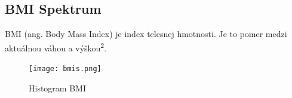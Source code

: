 \subsection{BMI Spektrum}

BMI (ang. Body Mass Index) je index telesnej hmotnosti. Je to pomer medzi aktuálnou váhou a výškou\textsuperscript 2.

\begin{figure}[h!]
	\centering
  		\texttt{[image: bmis.png]}
  	\caption{Histogram BMI}
  	\label{fig:hist-bmi}
\end{figure}














































